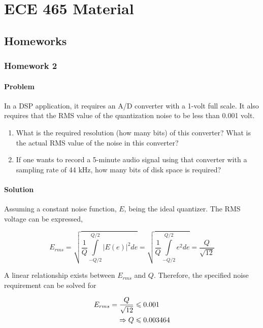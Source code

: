 \chapter{ECE 465 Material}

\section{Homeworks}

\subsection{Homework 2}

\subsubsection{Problem}

In a DSP application, it requires an A/D converter with a 1-volt full scale. 
It also requires that the RMS value of the quantization noise to be less than 
0.001 volt.

\begin{enumerate}
    \item What is the required resolution (how many bits) of this converter? 
    What is the actual RMS value of the noise in this converter? 
    \item  If one wants to record a 5-minute audio signal using that converter 
    with a sampling rate of 44 kHz, how many bits of disk space is required?
\end{enumerate}

\subsubsection{Solution}
Assuming a constant noise function, $E$, being the ideal quantizer. The RMS voltage can be expressed,

\begin{equation}
{E_{rms}} = \sqrt {\frac{1}{Q}\int\limits_{ - Q/2}^{Q/2} {{{\left| {E(e)} \right|}^2}de} }  = \sqrt {\frac{1}{Q}\int\limits_{ - Q/2}^{Q/2} {{e^2}de} }  = \frac{Q}{{\sqrt {12} }}
\end{equation}

A linear relationship exists between $E_{rms}$ and $Q$. Therefore, the specified noise requirement can be solved for

\begin{equation}
\begin{aligned}
  {E_{rms}} = \frac{Q}{{\sqrt {12} }} &\leqslant 0.001 \hfill \\
   \Rightarrow Q &\leqslant 0.003464 \hfill \\ 
\end{aligned} 
\end{equation}


